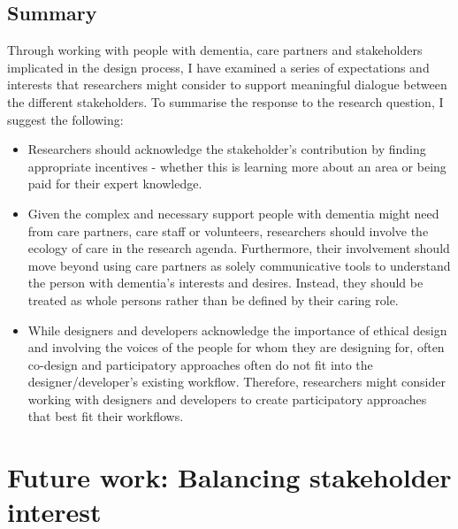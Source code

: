 \subsection{Summary}
\label{RQ3-summary}
Through working with people with dementia, care partners and stakeholders implicated in the design process, I have examined a series of expectations and interests that researchers might consider to support meaningful dialogue between the different stakeholders. To summarise the response to the research question, I  suggest the following:
\begin{itemize}
    \item Researchers should acknowledge the stakeholder's contribution by finding appropriate incentives - whether this is learning more about an area or being paid for their expert knowledge.
    \item Given the complex and necessary support people with dementia might need from care partners, care staff or volunteers, researchers should involve the ecology of care in the research agenda. Furthermore, their involvement should move beyond using care partners as solely communicative tools to understand the person with dementia's interests and desires. Instead, they should be treated as whole persons rather than be defined by their caring role.
    \item While designers and developers acknowledge the importance of ethical design and involving the voices of the people for whom they are designing for, often co-design and participatory approaches often do not fit into the designer/developer's existing workflow. Therefore, researchers might consider working with designers and developers to create participatory approaches that best fit their workflows.

\end{itemize}

\section{Future work: Balancing stakeholder interest}
\label{Discussion:Design}

